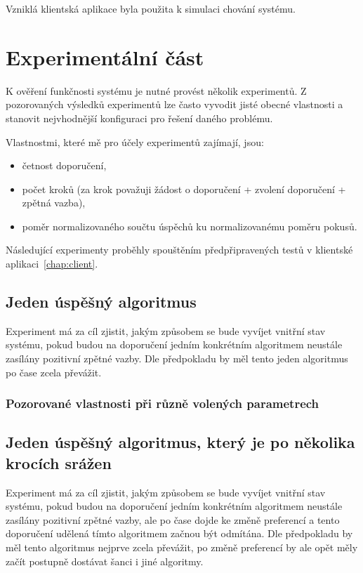 \documentclass[thesis=M,czech]{FITthesis}[2014/05/07]
\begin{document}
Vzniklá klientská aplikace byla použita k simulaci chování systému.

\chapter{Experimentální část}
\label{chap:tests}
K ověření funkčnosti systému je nutné provést několik experimentů. Z pozorovaných výsledků experimentů lze často vyvodit jisté obecné vlastnosti a stanovit nejvhodnější konfiguraci pro řešení daného problému.

Vlastnostmi, které mě pro účely experimentů zajímají, jsou:

\begin{itemize}
	\item četnost doporučení,
	\item počet kroků (za krok považuji žádost o doporučení + zvolení doporučení + zpětná vazba),
	\item poměr normalizovaného součtu úspěchů ku normalizovanému poměru pokusů.
\end{itemize}

Následující experimenty proběhly spouštěním předpřipravených testů v klientské aplikaci~\ref{chap:client}.

\section{Jeden úspěšný algoritmus}
Experiment má za cíl zjistit, jakým způsobem se bude vyvíjet vnitřní stav systému, pokud budou na doporučení jedním konkrétním algoritmem neustále zasílány pozitivní zpětné vazby. Dle předpokladu by měl tento jeden algoritmus po čase zcela převážit.

\subsection{Pozorované vlastnosti při různě volených parametrech}

\section{Jeden úspěšný algoritmus, který je po několika krocích srážen}
Experiment má za cíl zjistit, jakým způsobem se bude vyvíjet vnitřní stav systému, pokud budou na doporučení jedním konkrétním algoritmem neustále zasílány pozitivní zpětné vazby, ale po čase dojde ke změně preferencí a tento doporučení udělená tímto algoritmem začnou být odmítána. Dle předpokladu by měl tento algoritmus nejprve zcela převážit, po změně preferencí by ale opět měly začít postupně dostávat šanci i jiné algoritmy.
\end{document}
